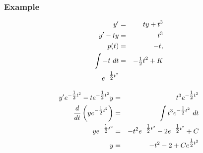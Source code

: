 \begin{frame}
  \frametitle{Example}

  \vspace*{-3em}
  \begin{eqnarray*}
    y' & = & ty + t^3 \\
    y' - ty & = & t^3 \\
    p(t) & = & -t, \\
    \int -t ~ dt & = & -\mbox{$\frac{1}{2}$} t^2 + K \\
    e^{-\mbox{$\frac{1}{2}$} t^2} & & 
  \end{eqnarray*}

  \begin{eqnarray*}
    y' e^{-\mbox{$\frac{1}{2}$} t^2} - t e^{-\mbox{$\frac{1}{2}$} t^2} y & = & t^3 e^{-\mbox{$\frac{1}{2}$} t^2} \\
    \frac{d}{dt} \left( y e^{-\mbox{$\frac{1}{2}$} t^2} \right) & = & \int t^3 e^{-\mbox{$\frac{1}{2}$} t^2} ~ dt \\
    y e^{-\mbox{$\frac{1}{2}$} t^2} & = & -t^2 e^{-\mbox{$\frac{1}{2}$} t^2} - 2 e^{-\mbox{$\frac{1}{2}$} t^2} + C \\
    y & = & -t^2 - 2 + C e^{\mbox{$\frac{1}{2}$} t^2}
  \end{eqnarray*}

\end{frame}



